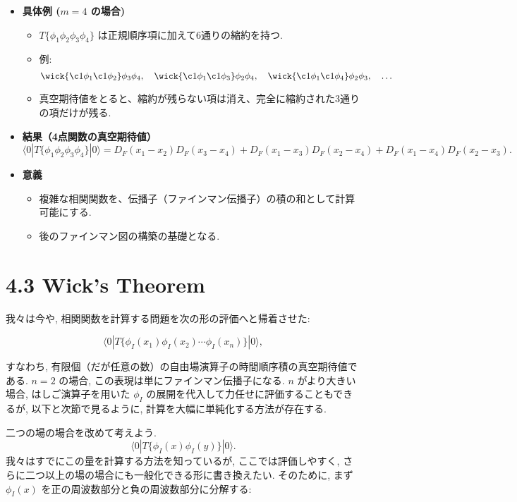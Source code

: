 \documentclass[a4paper,12pt]{article}
\begin{document}
\begin{itemize}
  \item \textbf{具体例 ($m=4$ の場合)}
  \begin{itemize}
    \item $T\{\phi_1\phi_2\phi_3\phi_4\}$ は正規順序項に加えて6通りの縮約を持つ.
    \item 例:
    \[
      \wick{\c1 \phi_1 \c1 \phi_2}\phi_3\phi_4,\quad
      \wick{\c1 \phi_1 \c1 \phi_3}\phi_2\phi_4,\quad
      \wick{\c1 \phi_1 \c1 \phi_4}\phi_2\phi_3,\quad \dots
    \]
    \item 真空期待値をとると、縮約が残らない項は消え、完全に縮約された3通りの項だけが残る.
  \end{itemize}

  \item \textbf{結果（4点関数の真空期待値）}
  \[
    \langle 0|T\{\phi_1\phi_2\phi_3\phi_4\}|0\rangle
    = D_F(x_1-x_2)D_F(x_3-x_4)
    + D_F(x_1-x_3)D_F(x_2-x_4)
    + D_F(x_1-x_4)D_F(x_2-x_3).
  \]

  \item \textbf{意義}
  \begin{itemize}
    \item 複雑な相関関数を、伝播子（ファインマン伝播子）の積の和として計算可能にする.
    \item 後のファインマン図の構築の基礎となる.
  \end{itemize}
\end{itemize}


\newpage
\color{black}
\section*{4.3 Wick's Theorem}

我々は今や, 相関関数を計算する問題を次の形の評価へと帰着させた:

\begin{equation*}
\langle 0 | T\{\phi_I(x_1)\phi_I(x_2)\cdots \phi_I(x_n)\} | 0 \rangle ,
\end{equation*}

すなわち, 有限個（だが任意の数）の自由場演算子の時間順序積の真空期待値である.  
$n=2$ の場合, この表現は単にファインマン伝播子になる.  
$n$ がより大きい場合, はしご演算子を用いた $\phi_I$ の展開を代入して力任せに評価することもできるが,  
以下と次節で見るように, 計算を大幅に単純化する方法が存在する.

二つの場の場合を改めて考えよう.  
\begin{equation*}
\langle 0 | T\{\phi_I(x)\phi_I(y)\} | 0 \rangle .
\end{equation*}
我々はすでにこの量を計算する方法を知っているが,  
ここでは評価しやすく, さらに二つ以上の場の場合にも一般化できる形に書き換えたい.  
そのために, まず $\phi_I(x)$ を正の周波数部分と負の周波数部分に分解する:
\end{document}
